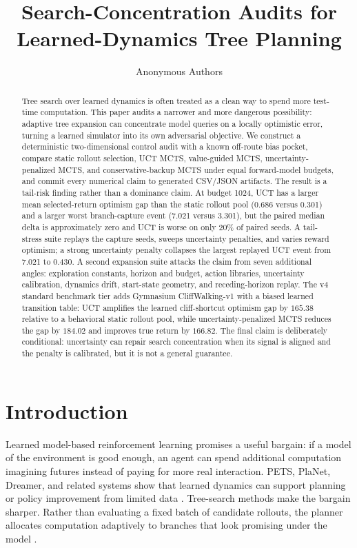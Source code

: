 \documentclass{article}
\title{Search-Concentration Audits for Learned-Dynamics Tree Planning}
\author{Anonymous Authors}
\begin{document}
\maketitle

\begin{abstract}
Tree search over learned dynamics is often treated as a clean way to spend more test-time computation. This paper audits a narrower and more dangerous possibility: adaptive tree expansion can concentrate model queries on a locally optimistic error, turning a learned simulator into its own adversarial objective. We construct a deterministic two-dimensional control audit with a known off-route bias pocket, compare static rollout selection, UCT MCTS, value-guided MCTS, uncertainty-penalized MCTS, and conservative-backup MCTS under equal forward-model budgets, and commit every numerical claim to generated CSV/JSON artifacts. The result is a tail-risk finding rather than a dominance claim. At budget 1024, UCT has a larger mean selected-return optimism gap than the static rollout pool (0.686 versus 0.301) and a larger worst branch-capture event (7.021 versus 3.301), but the paired median delta is approximately zero and UCT is worse on only 20\% of paired seeds. A tail-stress suite replays the capture seeds, sweeps uncertainty penalties, and varies reward optimism; a strong uncertainty penalty collapses the largest replayed UCT event from 7.021 to 0.430. A second expansion suite attacks the claim from seven additional angles: exploration constants, horizon and budget, action libraries, uncertainty calibration, dynamics drift, start-state geometry, and receding-horizon replay. The v4 standard benchmark tier adds Gymnasium CliffWalking-v1 with a biased learned transition table: UCT amplifies the learned cliff-shortcut optimism gap by \(165.38\) relative to a behavioral static rollout pool, while uncertainty-penalized MCTS reduces the gap by \(184.02\) and improves true return by \(166.82\). The final claim is deliberately conditional: uncertainty can repair search concentration when its signal is aligned and the penalty is calibrated, but it is not a general guarantee.
\end{abstract}

\section{Introduction}

Learned model-based reinforcement learning promises a useful bargain: if a model of the environment is good enough, an agent can spend additional computation imagining futures instead of paying for more real interaction. PETS, PlaNet, Dreamer, and related systems show that learned dynamics can support planning or policy improvement from limited data \citep{chua2018pets,hafner2019planet,hafner2020dreamer}. Tree-search methods make the bargain sharper. Rather than evaluating a fixed batch of candidate rollouts, the planner allocates computation adaptively to branches that look promising under the model \citep{kocsis2006bandit,browne2012survey,schrittwieser2020muzero,kohankhaki2024transition,riviere2024sets}.
\end{document}
